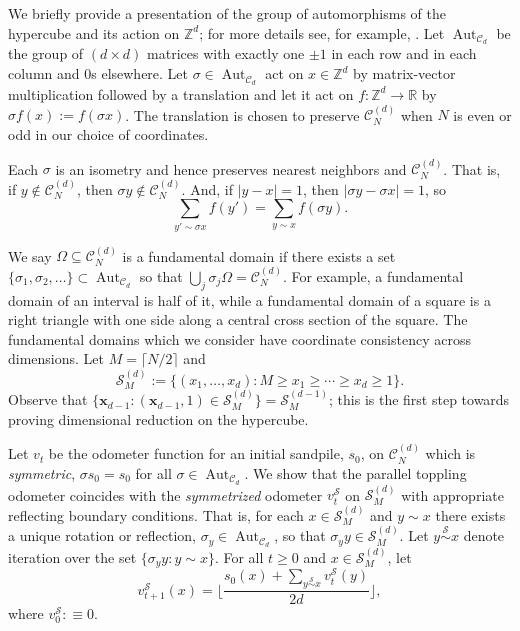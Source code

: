\documentclass[12pt]{amsart}
\newcommand{\Z}{\mathbb{Z}}
\begin{document}
	We briefly provide a presentation of the group of automorphisms of the hypercube
	and its action on $\Z^d$; for more details see, for example, \cite{godsil2013algebraic}. 
	Let $\operatorname{Aut}_{\mathcal{C}_d}$ be the group of $(d \times d)$ matrices 
	with exactly one $\pm 1$ in each row and in each column and $0$s elsewhere. 
	Let $\sigma \in \operatorname{Aut}_{\mathcal{C}_d}$ act on $x \in \Z^d$ by matrix-vector multiplication
	followed by a translation and let it act on $f:\Z^d \to \mathbb{R}$ by $\sigma f(x) := f(\sigma x)$. 
	The translation is chosen to preserve $\mathcal{C}_{N}^{(d)}$ when $N$ is even or odd in our choice of coordinates. 

	
	Each $\sigma$ is an isometry and hence preserves nearest neighbors and $\mathcal{C}^{(d)}_N$. 
	That is, if $y \not \in \mathcal{C}^{(d)}_{N}$, then $\sigma y \not \in \mathcal{C}^{(d)}_{N}$.
	And, if $|y-x| = 1$, then $|\sigma y - \sigma x| = 1$, so 
	\begin{equation} \label{eq:isometry}
	\sum_{y' \sim \sigma x} f(y') = \sum_{y \sim x} f(\sigma y).
	\end{equation}
	
	
	We say $\Omega \subseteq \mathcal{C}_{N}^{(d)}$ is a fundamental domain if there exists a set $\{\sigma_1, \sigma_2, \ldots \}  \subset  \operatorname{Aut}_{\mathcal{C}_d}$ so that $\bigcup_j \sigma_j \Omega = \mathcal{C}_{N}^{(d)}$. For example, a fundamental domain of an interval is half of it, 
	while a fundamental domain of a square is a right triangle with one side along a central cross section of the square. The fundamental domains which we consider have coordinate consistency across dimensions.  Let $M = \lceil N/2 \rceil$ and 
	\begin{equation}
	\mathcal{S}^{(d)}_M := \{ (x_1, \ldots, x_d): M \geq x_1 \geq \cdots \geq x_d \geq 1 \}.
	\end{equation}
	Observe that  $\{ \mathbf{x}_{d-1} : (\mathbf{x}_{d-1}, 1) \in \mathcal{S}^{(d)}_M\} = \mathcal{S}^{(d-1)}_M$;
	this is the first step towards proving dimensional reduction on the hypercube. 
	
	Let $v_t$ be the odometer function for an initial sandpile, $s_0$, on $\mathcal{C}_{N}^{(d)}$ which is {\it symmetric},  $ \sigma s_0 = s_0$ for all $ \sigma \in \operatorname{Aut}_{\mathcal{C}_d}$. We show that the parallel toppling odometer coincides 
	with the {\it symmetrized} odometer $v_t^{\mathcal{S}}$ on $\mathcal{S}_M^{(d)}$ with 
	appropriate reflecting boundary conditions. That is, for each $x \in \mathcal{S}_M^{(d)}$ and $y  \sim x$ there exists a unique rotation or reflection, $ \sigma_y \in \operatorname{Aut}_{\mathcal{C}_d}$, so that $ \sigma_y y \in \mathcal{S}_M^{(d)}$.
	Let $y \overset{\mathcal{S}}{\sim} x$ denote iteration over the set $\{  \sigma_y  y : y \sim x\}$.  For all $t \geq 0$ and $x \in \mathcal{S}_M^{(d)}$, let 
	\begin{equation}
	v_{t+1}^{\mathcal{S}}(x) = \lfloor \frac{ s_0(x) +  \sum_{y \overset{\mathcal{S}}{\sim}  x} v_t^{\mathcal{S}}(y)}{2 d} \rfloor, 
	\end{equation}
	where $v_0^{\mathcal{S}}: \equiv 0$. 
	
\end{document}
